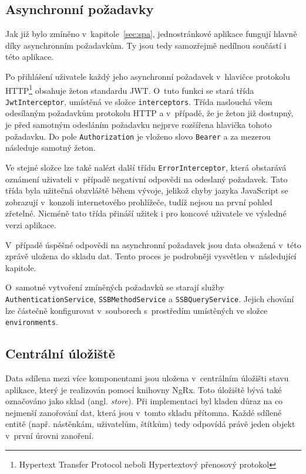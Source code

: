 \subsection{Asynchronní požadavky}
Jak již bylo zmíněno v~kapitole~\ref{sec:spa}, jednostránkové aplikace fungují hlavně díky asynchronním požadavkům. Ty jsou tedy samozřejmě nedílnou součástí i této aplikace.

Po přihlášení uživatele každý jeho asynchronní požadavek v~hlavičce protokolu HTTP\footnote{Hypertext Transfer Protocol neboli Hypertextový přenosový protokol} obsahuje žeton standardu JWT. O~tuto funkci se stará třída \texttt{JwtInterceptor}, umístěná ve složce \texttt{interceptors}. Třída naslouchá všem odesílaným požadavkům protokolu HTTP a v~případě, že je žeton již dostupný, je před samotným odesláním požadavku nejprve rozšířena hlavička tohoto požadavku. Do pole \texttt{Authorization} je vloženo slovo \texttt{Bearer} a za mezerou následuje samotný žeton.

Ve stejné složce lze také nalézt další třídu \texttt{ErrorInterceptor}, která obstarává oznámení uživateli v~případě negativní odpovědi na odeslaný požadavek. Tato třída byla užitečná obzvláště během vývoje, jelikož chyby jazyka JavaScript se zobrazují v~konzoli internetového prohlížeče, tudíž nejsou na první pohled zřetelné. Nicméně tato třída přináší užitek i pro koncové uživatele ve výsledné verzi aplikace.

V~případě úspěšné odpovědi na asynchronní požadavek jsou data obsažená v~této zprávě uložena do skladu dat. Tento proces je podrobněji vysvětlen v~následující kapitole.

O~samotné vytvoření zmíněných požadavků se starají služby \texttt{AuthenticationService}, \texttt{SSBMethodService} a \texttt{SSBQueryService}. Jejich chování lze částečně konfigurovat v~souborech s~prostředím umístěných ve složce \texttt{environments}.


\subsection{Centrální úložiště}
Data sdílena mezi více komponentami jsou uložena v~centrálním úložišti stavu aplikace, který je realizován pomocí knihovny NgRx. Toto úložiště bývá také označováno jako sklad (angl. \emph{store}). Při implementaci byl kladen důraz na co nejmenší zanořování dat, která jsou v~tomto skladu přítomna. Každé sdílené entitě (např. nástěnkám, uživatelům, štítkům) tedy odpovídá právě jeden objekt v~první úrovni zanoření.

